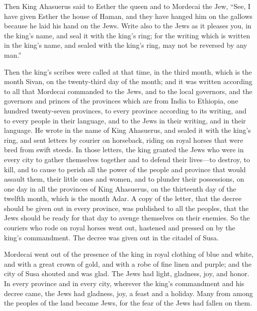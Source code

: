 \myverse{}Then King Ahasuerus said to Esther the queen and to Mordecai the
Jew, “See, I have given Esther the house of Haman, and they have hanged him on the gallows because he
laid his hand on the Jews.
\myverse{}Write also to the Jews as it pleases you, in the king’s name, and seal it with
the king’s ring; for the writing which is written in the king’s name, and sealed with the king’s ring,
may not be reversed by any man.”

\myverse{}Then the king’s scribes were called at that time, in the third
month, which is the month Sivan, on the twenty-third day of the month; and it was written according to
all that Mordecai commanded to the Jews, and to the local governors, and the governors and princes of
the provinces which are from India to Ethiopia, one hundred twenty-seven provinces, to every province
according to its writing, and to every people in their language, and to the Jews in their writing, and
in their language.
\myverse{}He wrote in the name of King Ahasuerus, and sealed it with the king’s ring,
and sent letters by courier on horseback, riding on royal horses that were bred from swift steeds.
\myverse{}In those letters, the king granted the Jews who were in every city to gather
themselves together and to defend their lives—to destroy, to kill, and to cause to perish all the power
of the people and province that would assault them, their little ones and women, and to plunder their
possessions,
\myverse{}on one day in all the provinces of King Ahasuerus, on the thirteenth day of
the twelfth month, which is the month Adar.
\myverse{}A copy of the letter, that the decree should be given out in every province,
was published to all the peoples, that the Jews should be ready for that day to avenge themselves on their
enemies.
\myverse{}So the couriers who rode on royal horses went out, hastened and pressed on
by the king’s commandment. The decree was given out in the citadel of Susa.

\myverse{}Mordecai went out of the presence of the king in royal clothing
of blue and white, and with a great crown of gold, and with a robe of fine linen and purple; and the city
of Susa shouted and was glad.
\myverse{}The Jews had light, gladness, joy, and honor.
\myverse{}In every province and in every city, wherever the king’s commandment and his
decree came, the Jews had gladness, joy, a feast and a holiday. Many from among the peoples of the land
became Jews, for the fear of the Jews had fallen on them.



